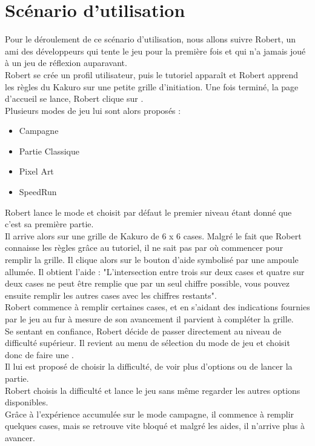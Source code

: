 \newpage
\wPt\vspace{-2.6cm}
\section{Scénario d’utilisation}
\newcommand{\perso}[1][ ]{Robert#1}
\begin{mdframed}%
    Pour le déroulement de ce scénario d'utilisation, nous allons suivre \perso[,] un ami des développeurs qui tente le jeu pour la première fois et qui n’a jamais joué à un jeu de réflexion auparavant.\\

    \perso se crée un profil utilisateur, puis le tutoriel apparaît et \perso apprend les règles du Kakuro sur une petite grille d'initiation.
    Une fois terminé, la page d'accueil se lance, \perso clique sur .\\
    Plusieurs modes de jeu lui sont alors proposés :
    \begin{itemize}
        \item Campagne
        \item Partie Classique
        \item Pixel Art
        \item SpeedRun
    \end{itemize}
    \perso lance le mode  et choisit par défaut le premier niveau étant donné que c'est sa première partie.\\
    Il arrive alors sur une grille de Kakuro de 6 x 6 cases. Malgré le fait que \perso connaisse les règles grâce au tutoriel, il ne sait pas par où commencer pour remplir la grille. Il clique alors sur le bouton d'aide symbolisé par une ampoule allumée. Il obtient l'aide : "L'intersection entre trois sur deux cases et quatre sur deux cases ne peut être remplie que par un seul chiffre possible, vous pouvez ensuite remplir les autres cases avec les chiffres restants".\\
    \perso commence à remplir certaines cases, et en s'aidant des indications fournies par le jeu au fur à mesure de son avancement il parvient à compléter la grille.\\

    Se sentant en confiance, \perso décide de passer directement au niveau de difficulté supérieur.
    Il revient au menu de sélection du mode de jeu et choisit donc de faire une . \\
    Il lui est proposé de choisir la difficulté, de voir plus d'options ou de lancer la partie.\\
    \perso choisis la difficulté  et lance le jeu sans même regarder les autres options disponibles.\\
    Grâce à l'expérience accumulée sur le mode campagne, il commence à remplir quelques cases, mais se retrouve vite bloqué et malgré les aides, il n'arrive plus à avancer.\\


\end{mdframed}
